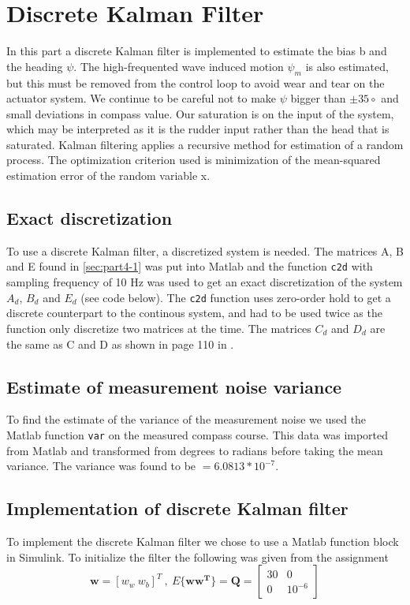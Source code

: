 
\section{Discrete Kalman Filter} \label{sec:part5}
In this part a discrete Kalman filter is implemented to estimate the bias b and the heading $\psi$. The high-frequented wave induced motion $\psi_m$ is also estimated, but this must be removed from the control loop to avoid wear and tear on the actuator system. We continue to be careful not to make $\psi$ bigger than $\pm 35 \circ$ and small deviations in compass value. Our saturation is on the input of the system, which may be interpreted as it is the rudder input rather than the head that is saturated. 
\medskip
Kalman filtering applies a recursive method for estimation of a random process. The optimization criterion used is minimization of the mean-squared estimation error of the random variable x.

\subsection{Exact discretization}
To use a discrete Kalman filter, a discretized system is needed. The matrices A, B and E found in \ref{sec:part4-1} was put into Matlab and the function \texttt{c2d} with sampling frequency of 10 Hz was used to get an exact discretization of the system $A_d$, $B_d$ and $E_d$ (see code below). The \texttt{c2d} function uses zero-order hold to get a discrete counterpart to the continous system, and had to be used twice as the function only discretize two matrices at the time. The matrices $C_d$ and $D_d$ are the same as C and D as shown in page 110 in \cite{chen14}.



\subsection{Estimate of measurement noise variance}\label{eq:noise_vaiance}
To find the estimate of the variance of the measurement noise we used the Matlab function \texttt{var} on the measured compass course. This data was imported from Matlab and transformed from degrees to radians before taking the mean variance. The variance was found to be $ = 6.0813*10^{-7}$.




\subsection{Implementation of discrete Kalman filter}
To implement the discrete Kalman filter we chose to use a Matlab function block in Simulink. To initialize the filter the following was given from the assignment
\begin{equation}
    \boldsymbol{w} = [w_w \ w_b]^T \ , \ E\{\boldsymbol{w w^T}\} = \boldsymbol{Q} = \begin{bmatrix}
        30 & 0 \\
        0 & 10^{-6} 
    \end{bmatrix}
\end{equation}

